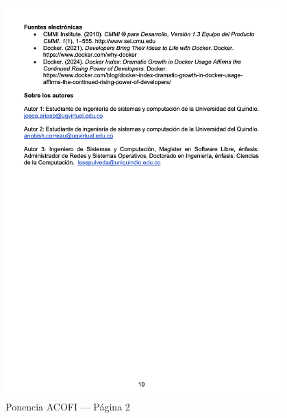 \begin{figure}[H]
	\centering
	\begin{tcolorbox}[
			colback=white,
			colframe=gray!50,
			boxrule=1pt,
			arc=2pt,
			boxsep=5pt,
			left=3pt,
			right=3pt,
			top=3pt,
			bottom=3pt,
			drop shadow
		]
		\includegraphics[width=0.95\textwidth,keepaspectratio]{apendices/ACOFI/pagina_2.png}
	\end{tcolorbox}
	\caption{Ponencia ACOFI --- Página 2}\label{fig:acofi-pagina-2}
\end{figure}
\FloatBarrier%

